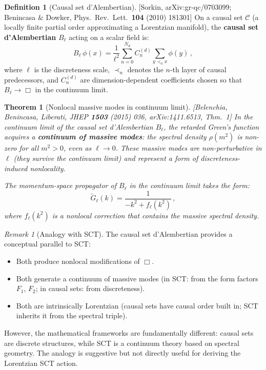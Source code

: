 \documentclass[12pt,a4paper]{article}
\newtheorem{theorem}[proposition]{Theorem}
\theoremstyle{definition}
\newtheorem{definition}[proposition]{Definition}
\theoremstyle{remark}
\newtheorem{remark}[proposition]{Remark}
\newcommand{\fromlit}[1]{\textcolor{blue!70!black}{\textsf{[#1]}}}
\begin{document}
\begin{definition}[Causal set d'Alembertian]
\label{def:cs-dalembert}
\fromlit{Sorkin, arXiv:gr-qc/0703099; Benincasa \& Dowker, Phys.\ Rev.\
Lett.\ \textbf{104} (2010) 181301}
On a causal set $\mathcal{C}$ (a locally finite partial order
approximating a Lorentzian manifold), the \textbf{causal set
d'Alembertian} $B_\ell$ acting on a scalar field is:
\begin{equation}\label{eq:cs-box}
  B_\ell\,\phi(x) = \frac{1}{\ell^2}\sum_{n=0}^{N_d}
  C_n^{(d)}\sum_{y \prec_n x} \phi(y)\,,
\end{equation}
where $\ell$ is the discreteness scale, $\prec_n$ denotes the
$n$-th layer of causal predecessors, and $C_n^{(d)}$ are
dimension-dependent coefficients chosen so that
$B_\ell \to \Box$ in the continuum limit.
\end{definition}

\begin{theorem}[Nonlocal massive modes in continuum limit]
\label{thm:belenchia}
\fromlit{Belenchia, Benincasa, Liberati, JHEP \textbf{1503} (2015)
036, arXiv:1411.6513, Thm.~1}
In the continuum limit of the causal set d'Alembertian $B_\ell$, the
retarded Green's function acquires a \textbf{continuum of massive
modes}: the spectral density $\rho(m^2)$ is non-zero for all
$m^2 > 0$, even as $\ell \to 0$.  These massive modes are
\emph{non-perturbative} in $\ell$ (they survive the continuum limit)
and represent a form of discreteness-induced nonlocality.

The momentum-space propagator of $B_\ell$ in the continuum limit
takes the form:
\begin{equation}
  \tilde{G}_\ell(k) = \frac{1}{-k^2 + f_\ell(k^2)}\,,
\end{equation}
where $f_\ell(k^2)$ is a nonlocal correction that contains the
massive spectral density.
\end{theorem}

\begin{remark}[Analogy with SCT]
\label{rem:cs-sct}
The causal set d'Alembertian provides a conceptual parallel to SCT:
\begin{itemize}[nosep]
  \item Both produce nonlocal modifications of $\Box$.
  \item Both generate a continuum of massive modes (in SCT: from the
    form factors $F_1$, $F_2$; in causal sets: from discreteness).
  \item Both are intrinsically Lorentzian (causal sets have causal
    order built in; SCT inherits it from the spectral triple).
\end{itemize}
However, the mathematical frameworks are fundamentally different:
causal sets are discrete structures, while SCT is a continuum theory
based on spectral geometry.  The analogy is suggestive but not
directly useful for deriving the Lorentzian SCT action.
\end{remark}
\end{document}
